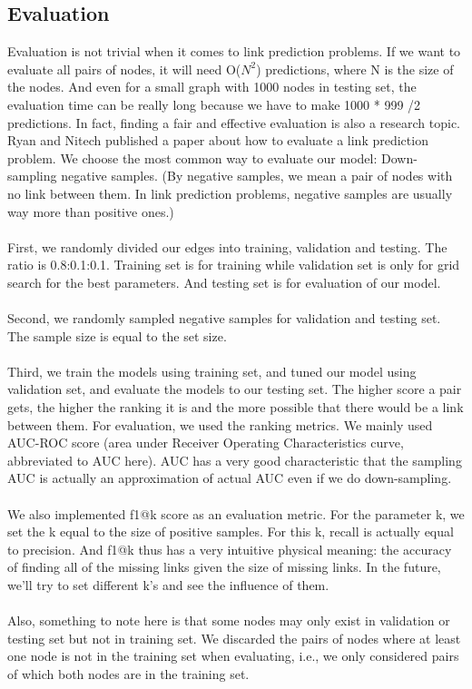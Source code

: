 \documentclass[12pt]{article}
\begin{document}
\subsection{Evaluation}
Evaluation is not trivial when it comes to link prediction problems. If we want to evaluate all pairs of nodes, it will need O($N^2$) predictions, where N is the size of the nodes. And even for a small graph with 1000 nodes in testing set, the evaluation time can be really long because we have to make 1000 * 999 /2 predictions. In fact, finding a fair and effective evaluation is also a research topic. Ryan and Nitech published a paper \cite{eval} about how to evaluate a link prediction problem. We choose the most common way to evaluate our model: Down-sampling negative samples. (By negative samples, we mean a pair of nodes with no link between them. In link prediction problems, negative samples are usually way more than positive ones.)
\\
\\
First, we randomly divided our edges into training, validation and testing. The ratio is 0.8:0.1:0.1. Training set is for training while validation set is only for grid search for the best parameters. And testing set is for evaluation of our model. 
\\
\\
Second, we randomly sampled negative samples for validation and testing set. The sample size is equal to the set size.
\\
\\
Third, we train the models using training set, and tuned our model using validation set, and evaluate the models to our testing set. The higher score a pair gets, the higher the ranking it is and the more possible that there would be a link between them. For evaluation, we used the ranking metrics. We mainly used AUC-ROC score (area under Receiver Operating Characteristics curve, abbreviated to AUC here). AUC has a very good characteristic that the sampling AUC is actually an approximation of actual AUC even if we do down-sampling. 
\\
\\
We also implemented f1@k score as an evaluation metric. For the parameter k, we set the k equal to the size of positive samples. For this k, recall is actually equal to precision. And f1@k thus has a very intuitive physical meaning: the accuracy of finding all of the missing links given the size of missing links. In the future, we'll try to set different k's and see the influence of them. 
\\
\\
Also, something to note here is that some nodes may only exist in validation or testing set but not in training set. We discarded the pairs of nodes where at least one node is not in the training set when evaluating, i.e., we only considered pairs of which both nodes are in the training set.
\end{document}
